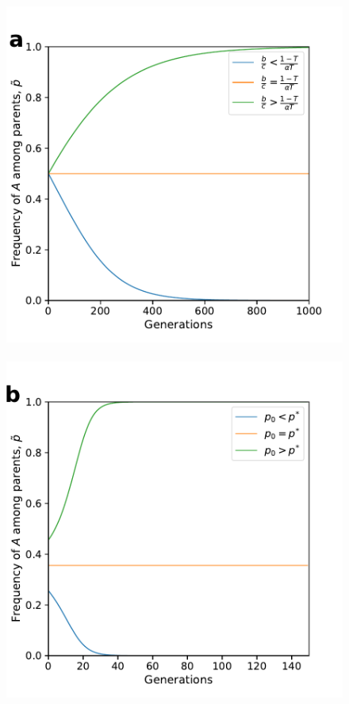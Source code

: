 \documentclass[12pt]{extarticle}
\begin{document}
\begin{figure}[p]
  \centering
    \includegraphics[scale=0.45]{Time_Figure_Equal_Horizontal.pdf}
    ~\\
    \includegraphics[scale=0.45]{Time_Figure_Only_Vertical_No_Alpha.pdf}

\end{figure}
\end{document}
